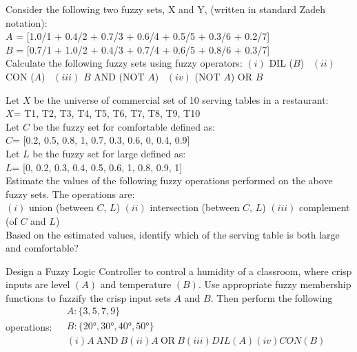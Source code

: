  Consider the following two fuzzy sets, X and Y, (written in standard Zadeh notation):\\
$A$ = [1.0/1 + 0.4/2 + 0.7/3 + 0.6/4 + 0.5/5 + 0.3/6 + 0.2/7]\\
$B$ = [0.7/1 + 1.0/2 + 0.4/3 + 0.7/4 + 0.6/5 + 0.8/6 + 0.3/7]\\
Calculate the following fuzzy sets using fuzzy operators:
$(i)$ DIL ($B$) \, 
$(ii)$ CON ($A$) \, 
$(iii)$ {$B$ AND (NOT $A$)} \, 
$(iv)$ {(NOT $A$) OR $B$}


 Let $X$ be the universe of commercial set of 10 serving tables in a restaurant:\\
$X$= {T1, T2, T3, T4, T5, T6, T7, T8, T9, T10}\\[0.5em]
Let $C$ be the fuzzy set for comfortable defined as:\\
$C$= [0.2, 0.5, 0.8, 1, 0.7, 0.3, 0.6, 0, 0.4, 0.9]\\[0.5em]
Let $L$ be the fuzzy set for large defined as:\\
$L$= [0, 0.2, 0.3, 0.4, 0.5, 0.6, 1, 0.8, 0.9, 1]\\[0.5em]
Estimate the values of the following fuzzy operations performed on the above fuzzy sets. The operations are:\\
$(i)$ union (between $C$, $L$) \quad
$(ii)$ intersection (between $C$, $L$) \quad
$(iii)$ complement (of $C$ and $L$)\\
Based on the estimated values, identify which of the serving table is both large and comfortable?


Design a Fuzzy Logic Controller to control a humidity of a classroom, where crisp inputs are level $(A)$ and temperature $(B)$. Use appropriate fuzzy membership functions to fuzzify the crisp input sets $A$ and $B$. Then perform the following operations:
$\begin{aligned}
   & A: \{3,5,7,9\}\\
   & B: \{20°, 30°, 40°, 50°\} \\
   & (i) A \ \text{AND} \ B
   (ii) A \ \text{OR} \ B
   (iii) DIL(A)
   (iv) CON(B)\\
\end{aligned}$\\ 